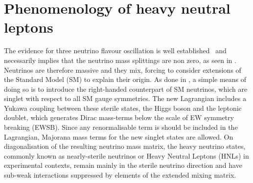 \clearpage
\chapter{Phenomenology of heavy neutral leptons}
\label{cha:mass_models}


The evidence for three neutrino flavour oscillation is well established~\cite{Fukuda:1998mi,Aharmim:2005gt, Esteban:2018azc} %
and necessarily implies that the neutrino mass splittings are non zero, as seen in .
Neutrinos are therefore massive and they mix, forcing to consider extensions of the Standard Model (SM) to explain their origin. 
As done in , a simple means of doing so is to introduce the right-handed counterpart of SM neutrinos,
which are singlet with respect to all SM gauge symmetries.
The new Lagrangian includes a Yukawa coupling between these sterile states, the Higgs boson and the leptonic doublet, %
which generates Dirac mass-terms below the scale of EW symmetry breaking (EWSB).
Since any renormalisable term is should be included in the Lagrangian, %
Majorana mass terms for the new singlet states are allowed.
On diagonalisation of the resulting neutrino mass matrix, the heavy neutrino states, %
commonly known as nearly-sterile neutrinos or Heavy Neutral Leptons (HNLs) in experimental contexts, %
remain mainly in the sterile neutrino direction and have sub-weak interactions suppressed by %
elements of the extended mixing matrix. 

